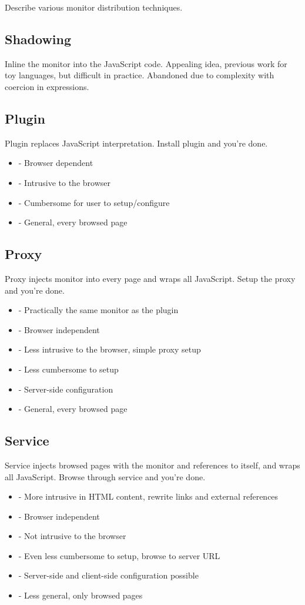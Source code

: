 \documentclass{llncs}
\begin{document}
Describe various monitor distribution techniques.


\subsection{Shadowing}

Inline the monitor into the JavaScript code. Appealing idea, previous work for 
toy languages, but difficult in practice. Abandoned due to complexity with 
coercion in expressions.

\subsection{Plugin}

Plugin replaces JavaScript interpretation. Install plugin and you're done.
\begin{itemize}
\item- Browser dependent
\item- Intrusive to the browser
\item- Cumbersome for user to setup/configure
\item- General, every browsed page
\end{itemize}

\subsection{Proxy}

Proxy injects monitor into every page and wraps all JavaScript. Setup the proxy 
and you're done.
\begin{itemize}
\item- Practically the same monitor as the plugin
\item- Browser independent
\item- Less intrusive to the browser, simple proxy setup
\item- Less cumbersome to setup
\item- Server-side configuration
\item- General, every browsed page
\end{itemize}

\subsection{Service}

Service injects browsed pages with the monitor and references to itself, and 
wraps all JavaScript. Browse through service and you're done.
\begin{itemize}
\item- More intrusive in HTML content, rewrite links and external references 
\item- Browser independent
\item- Not intrusive to the browser
\item- Even less cumbersome to setup, browse to server URL
\item- Server-side and client-side configuration possible
\item- Less general, only browsed pages
\end{itemize}
\end{document}
